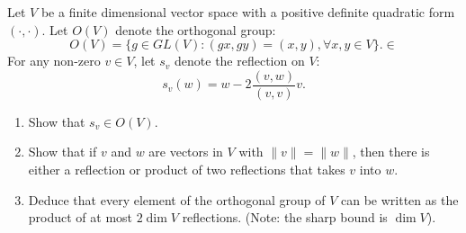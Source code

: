 \begin{exercise}
\label{algebra:2012:9}
Let $V$ be a finite dimensional vector space with a positive definite quadratic form $(\cdot, \cdot)$. Let $O(V)$ denote the orthogonal group:
\[ O(V) = \{ g \in GL(V) : (gx, gy) = (x, y), \forall x, y \in V \}. \in \]
For any non-zero $v \in V$, let $s_v$ denote the reflection on $V$:
\[ s_v(w) = w - 2 \frac{(v, w)}{(v, v)} v. \]
\begin{enumerate}
    \item Show that $s_v \in O(V)$.
    \item Show that if $v$ and $w$ are vectors in $V$ with $\|v\| = \|w\|$, then there is either a reflection or product of two reflections that takes $v$ into $w$.
    \item Deduce that every element of the orthogonal group of $V$ can be written as the product of at most $2 \dim V$ reflections. (Note: the sharp bound is $\dim V$).
\end{enumerate}
\end{exercise}


